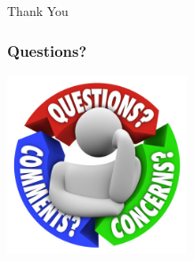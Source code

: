 \documentclass[10pt]{beamer}
\begin{document}
\begin{frame}
  \begin{center}
    \Huge{Thank You}
  \end{center}
\end{frame}

\begin{frame}
	\frametitle{Questions?}
	\begin{center}
	  \includegraphics[width=0.40\textwidth]{q5.jpg}
	\end{center}
\end{frame}

\end{document}
